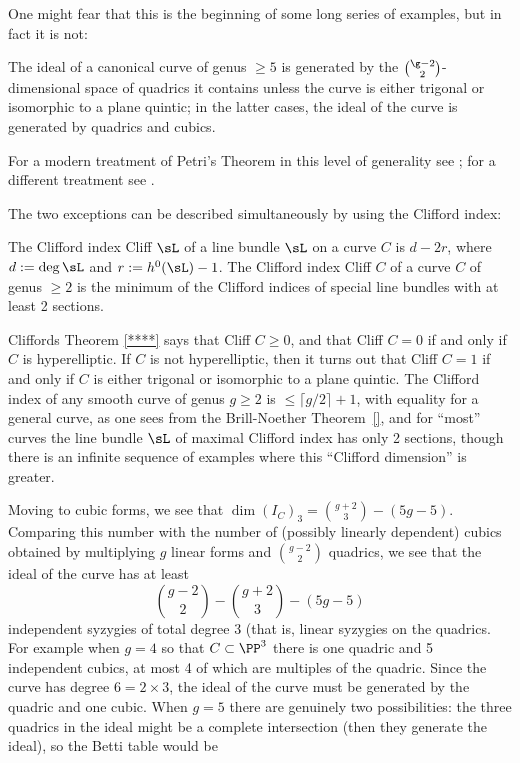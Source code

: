 One might fear that this is the beginning of some long series of examples, but in fact it is not: 

\begin{theorem} [Petri]
The ideal of a canonical curve of genus $\geq 5$ is generated by the $\g-2\choose 2$-dimensional space of quadrics it contains unless the curve is either trigonal or isomorphic to a plane quintic; in the latter cases, the ideal of the curve is generated by quadrics and cubics.
\end{theorem}

For a modern treatment of Petri's Theorem in this level of generality see \cite{Schreyer}; for a different treatment see \cite{Arbarello-Sernesi}.

The two exceptions can be described simultaneously by using the Clifford index:

\begin{definition}
 The Clifford index Cliff $\sL$ of a line bundle $\sL$ on a curve $C$ is $d-2r$, where $d := \deg \sL$ and $r :=  h^0(\sL)-1$. The Clifford index Cliff $C$ of
 a curve $C$ of genus $\geq 2$ is the minimum of the Clifford indices of special line bundles with at least 2 sections.
\end{definition}

Cliffords Theorem \ref{****} says that Cliff $C \geq 0$, and that Cliff $C = 0$ if and only if $C$ is hyperelliptic. If $C$ is not hyperelliptic, then it turns out that Cliff $C=1$ if and only if $C$ is either trigonal or isomorphic to a plane quintic. The Clifford index of any smooth curve of genus $g\geq 2$ is $\leq \lceil g/2\rceil+1$, with equality for a general curve, as one sees from the Brill-Noether Theorem~\ref{}, and for ``most'' curves the line bundle $\sL$ of maximal Clifford index has only 2 sections, though there is an infinite sequence of examples where this
``Clifford dimension'' is greater.

Moving to cubic forms, we see that $\dim ({I_C})_3 = {g+2\choose 3}-(5g-5)$. Comparing this number with the number of (possibly linearly dependent)
cubics obtained by multiplying $g$ linear forms and ${g-2\choose 2}$ quadrics, we see that the ideal of the curve has at least
$$
{g-2\choose 2} - {g+2\choose 3}-(5g-5) 
$$
independent syzygies of total degree 3 (that is, linear syzygies on the quadrics. For example when $g=4$ so that $C\subset \PP^3$ there is one quadric and 5 independent
cubics, at most 4 of which are multiples of the quadric. Since the curve has degree $6 = 2\times 3$, the ideal of the curve must be generated by
the quadric and one cubic. When $g=5$ there are genuinely two possibilities: the three quadrics in the ideal might be a complete intersection
(then they generate the ideal), so the Betti table would be

